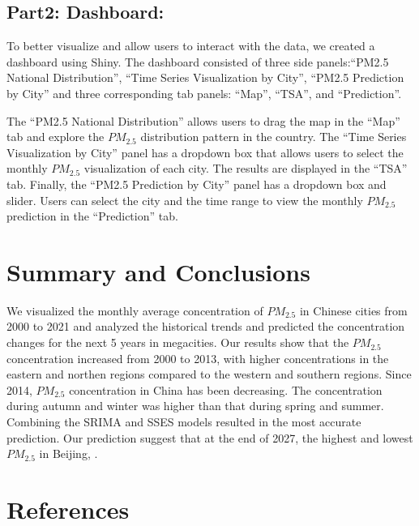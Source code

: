 \documentclass[
  12pt,
]{article}
\begin{document}
\hypertarget{part2-dashboard}{%
\subsection{Part2: Dashboard:}\label{part2-dashboard}}

To better visualize and allow users to interact with the data, we
created a dashboard using Shiny. The dashboard consisted of three side
panels:``PM2.5 National Distribution'', ``Time Series Visualization by
City'', ``PM2.5 Prediction by City'' and three corresponding tab panels:
``Map'', ``TSA'', and ``Prediction''.

The ``PM2.5 National Distribution'' allows users to drag the map in the
``Map'' tab and explore the \(PM_{2.5}\) distribution pattern in the
country. The ``Time Series Visualization by City'' panel has a dropdown
box that allows users to select the monthly \(PM_{2.5}\) visualization
of each city. The results are displayed in the ``TSA'' tab. Finally, the
``PM2.5 Prediction by City'' panel has a dropdown box and slider. Users
can select the city and the time range to view the monthly \(PM_{2.5}\)
prediction in the ``Prediction'' tab.

\newpage

\hypertarget{summary-and-conclusions}{%
\section{Summary and Conclusions}\label{summary-and-conclusions}}

We visualized the monthly average concentration of \(PM_{2.5}\) in
Chinese cities from 2000 to 2021 and analyzed the historical trends and
predicted the concentration changes for the next 5 years in megacities.
Our results show that the \(PM_{2.5}\) concentration increased from 2000
to 2013, with higher concentrations in the eastern and northen regions
compared to the western and southern regions. Since 2014, \(PM_{2.5}\)
concentration in China has been decreasing. The concentration during
autumn and winter was higher than that during spring and summer.
Combining the SRIMA and SSES models resulted in the most accurate
prediction. Our prediction suggest that at the end of 2027, the highest
and lowest \(PM_{2.5}\) in Beijing, .

\newpage

\hypertarget{references}{%
\section*{References}\label{references}}
\end{document}

